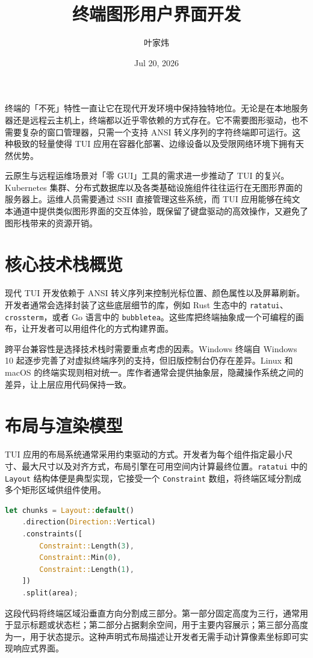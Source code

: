 \title{终端图形用户界面开发}
\author{叶家炜}
\date{Jul 20, 2026}
\maketitle
终端的「不死」特性一直让它在现代开发环境中保持独特地位。无论是在本地服务器还是远程云主机上，终端都以近乎零依赖的方式存在。它不需要图形驱动，也不需要复杂的窗口管理器，只需一个支持 ANSI 转义序列的字符终端即可运行。这种极致的轻量使得 TUI 应用在容器化部署、边缘设备以及受限网络环境下拥有天然优势。\par
云原生与远程运维场景对「零 GUI」工具的需求进一步推动了 TUI 的复兴。Kubernetes 集群、分布式数据库以及各类基础设施组件往往运行在无图形界面的服务器上。运维人员需要通过 SSH 直接管理这些系统，而 TUI 应用能够在纯文本通道中提供类似图形界面的交互体验，既保留了键盘驱动的高效操作，又避免了图形栈带来的资源开销。\par
\chapter{核心技术栈概览}
现代 TUI 开发依赖于 ANSI 转义序列来控制光标位置、颜色属性以及屏幕刷新。开发者通常会选择封装了这些底层细节的库，例如 Rust 生态中的 \texttt{ratatui}、\texttt{crossterm}，或者 Go 语言中的 \texttt{bubbletea}。这些库把终端抽象成一个可编程的画布，让开发者可以用组件化的方式构建界面。\par
跨平台兼容性是选择技术栈时需要重点考虑的因素。Windows 终端自 Windows 10 起逐步完善了对虚拟终端序列的支持，但旧版控制台仍存在差异。Linux 和 macOS 的终端实现则相对统一。库作者通常会提供抽象层，隐藏操作系统之间的差异，让上层应用代码保持一致。\par
\chapter{布局与渲染模型}
TUI 应用的布局系统通常采用约束驱动的方式。开发者为每个组件指定最小尺寸、最大尺寸以及对齐方式，布局引擎在可用空间内计算最终位置。\texttt{ratatui} 中的 \texttt{Layout} 结构体便是典型实现，它接受一个 \texttt{Constraint} 数组，将终端区域分割成多个矩形区域供组件使用。\par
\begin{lstlisting}[language=rust]
let chunks = Layout::default()
    .direction(Direction::Vertical)
    .constraints([
        Constraint::Length(3),
        Constraint::Min(0),
        Constraint::Length(1),
    ])
    .split(area);
\end{lstlisting}
这段代码将终端区域沿垂直方向分割成三部分。第一部分固定高度为三行，通常用于显示标题或状态栏；第二部分占据剩余空间，用于主要内容展示；第三部分高度为一，用于状态提示。这种声明式布局描述让开发者无需手动计算像素坐标即可实现响应式界面。\par
